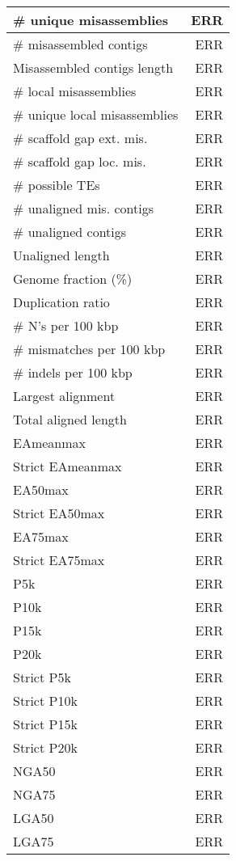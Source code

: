 \documentclass[12pt,a4paper]{article}
\begin{document}
\begin{table}[ht]
\begin{center}
\begin{tabular}{|l*{1}{|r}|}
\# unique misassemblies & ERR \\ \hline
\# misassembled contigs & ERR \\ \hline
Misassembled contigs length & ERR \\ \hline
\# local misassemblies & ERR \\ \hline
\# unique local misassemblies & ERR \\ \hline
\# scaffold gap ext. mis. & ERR \\ \hline
\# scaffold gap loc. mis. & ERR \\ \hline
\# possible TEs & ERR \\ \hline
\# unaligned mis. contigs & ERR \\ \hline
\# unaligned contigs & ERR \\ \hline
Unaligned length & ERR \\ \hline
Genome fraction (\%) & ERR \\ \hline
Duplication ratio & ERR \\ \hline
\# N's per 100 kbp & ERR \\ \hline
\# mismatches per 100 kbp & ERR \\ \hline
\# indels per 100 kbp & ERR \\ \hline
Largest alignment & ERR \\ \hline
Total aligned length & ERR \\ \hline
EAmeanmax & ERR \\ \hline
Strict EAmeanmax & ERR \\ \hline
EA50max & ERR \\ \hline
Strict EA50max & ERR \\ \hline
EA75max & ERR \\ \hline
Strict EA75max & ERR \\ \hline
P5k & ERR \\ \hline
P10k & ERR \\ \hline
P15k & ERR \\ \hline
P20k & ERR \\ \hline
Strict P5k & ERR \\ \hline
Strict P10k & ERR \\ \hline
Strict P15k & ERR \\ \hline
Strict P20k & ERR \\ \hline
NGA50 & ERR \\ \hline
NGA75 & ERR \\ \hline
LGA50 & ERR \\ \hline
LGA75 & ERR \\ \hline
\end{tabular}
\end{center}
\end{table}
\end{document}
